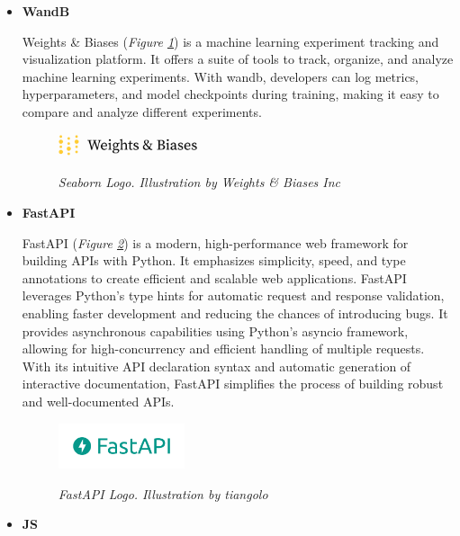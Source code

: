 \begin{itemize}
\item \textbf{WandB}

Weights \& Biases (\textit{Figure \ref{fig:wandb-logo}}) is a machine learning experiment tracking and visualization platform. It offers a suite of tools to track, organize, and analyze machine learning experiments. With wandb, developers can log metrics, hyperparameters, and model checkpoints during training, making it easy to compare and analyze different experiments.

\begin{figure}[H]
\centering
\includegraphics[width=0.4\textwidth]{imatges/studies_and_decisions/wandb-logo.png}
\caption[Seaborn Logo]{\textit{Seaborn Logo. Illustration by Weights \& Biases Inc}}
{\label{fig:wandb-logo}}
\end{figure}

\item \textbf{FastAPI}

FastAPI (\textit{Figure \ref{fig:fastapi-logo}}) is a modern, high-performance web framework for building APIs with Python. It emphasizes simplicity, speed, and type annotations to create efficient and scalable web applications. FastAPI leverages Python's type hints for automatic request and response validation, enabling faster development and reducing the chances of introducing bugs. It provides asynchronous capabilities using Python's asyncio framework, allowing for high-concurrency and efficient handling of multiple requests. With its intuitive API declaration syntax and automatic generation of interactive documentation, FastAPI simplifies the process of building robust and well-documented APIs.

\begin{figure}[H]
\centering
\begin{adjustbox}{trim=0cm 0.25cm, clip}
\includegraphics[width=0.35\textwidth]{imatges/studies_and_decisions/fastapi-logo.png}
\end{adjustbox}
\caption[FastAPI Logo]{\textit{FastAPI Logo. Illustration by tiangolo}}
{\label{fig:fastapi-logo}}
\end{figure}

\item \textbf{JS}


\end{itemize}

